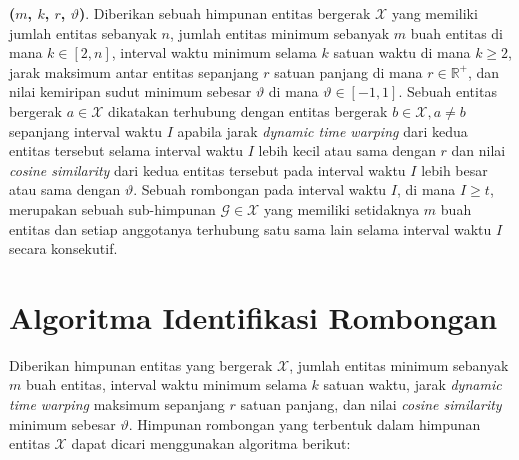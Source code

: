 \noindent \textbf{\pergerakankolektif($m$, $k$, $r$, $\vartheta$)}. Diberikan sebuah himpunan entitas bergerak $\mathcal{X}$ yang memiliki jumlah entitas sebanyak $n$, jumlah entitas minimum sebanyak $m$ buah entitas di mana $k \in [2, n]$, interval waktu minimum selama $k$ satuan waktu di mana $k \geq 2$, jarak maksimum antar entitas sepanjang $r$ satuan panjang di mana $r \in \mathbb{R}^+$, dan nilai kemiripan sudut minimum sebesar $\vartheta$ di mana $\vartheta \in [-1, 1]$. Sebuah entitas bergerak $a \in \mathcal{X}$ dikatakan terhubung dengan entitas bergerak $b \in \mathcal{X}, a \neq b$ sepanjang interval waktu $I$ apabila jarak \textit{dynamic time warping} dari kedua entitas tersebut selama interval waktu $I$ lebih kecil atau sama dengan $r$ dan nilai \textit{cosine similarity} dari kedua entitas tersebut pada interval waktu $I$ lebih besar atau sama dengan $\vartheta$. Sebuah rombongan pada interval waktu $I$, di mana $I \geq t$, merupakan sebuah sub-himpunan $\mathcal{G} \in \mathcal{X}$ yang memiliki setidaknya $m$ buah entitas dan setiap anggotanya terhubung satu sama lain selama interval waktu $I$ secara konsekutif.

\section{Algoritma Identifikasi Rombongan}
\label{sec:algoritma}
    
Diberikan himpunan entitas yang bergerak $\mathcal{X}$, jumlah entitas minimum sebanyak $m$ buah entitas, interval waktu minimum selama $k$ satuan waktu, jarak \textit{dynamic time warping} maksimum sepanjang $r$ satuan panjang, dan nilai \textit{cosine similarity} minimum sebesar $\vartheta$. Himpunan rombongan yang terbentuk dalam himpunan entitas $\mathcal{X}$ dapat dicari menggunakan algoritma berikut:

